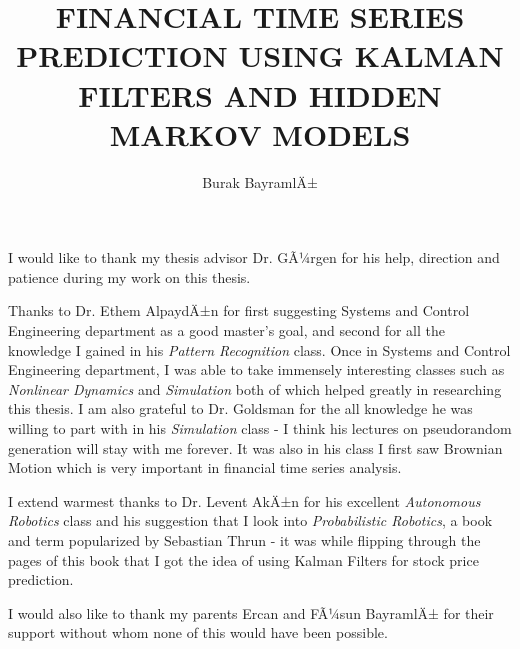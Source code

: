 

\title{FINANCIAL TIME SERIES PREDICTION USING KALMAN FILTERS AND HIDDEN MARKOV MODELS}


\author{Burak BayramlÄ±}









\makemstitle        %

\makeapprovalpage

\begin{acknowledgements}
I would like to thank my thesis advisor Dr. GÃ¼rgen for his help, direction and
patience during my work on this thesis. 

Thanks to Dr. Ethem AlpaydÄ±n for first suggesting Systems and Control
Engineering department as a good master's goal, and second for all the knowledge
I gained in his {\em Pattern Recognition} class. Once in Systems and Control
Engineering department, I was able to take immensely interesting classes such as
{\em Nonlinear Dynamics} and {\em Simulation} both of which helped greatly in
researching this thesis. I am also grateful to Dr. Goldsman for the all
knowledge he was willing to part with in his {\em Simulation} class - I think
his lectures on pseudorandom generation will stay with me forever. It was also
in his class I first saw Brownian Motion which is very important in financial
time series analysis.

I extend warmest thanks to Dr. Levent AkÄ±n for his excellent {\em Autonomous
Robotics} class and his suggestion that I look into {\em Probabilistic
Robotics}, a book and term popularized by Sebastian Thrun - it was while
flipping through the pages of this book that I got the idea of using Kalman
Filters for stock price prediction.

I would also like to thank my parents Ercan and FÃ¼sun BayramlÄ± for their support
without whom none of this would have been possible.
\end{acknowledgements}


